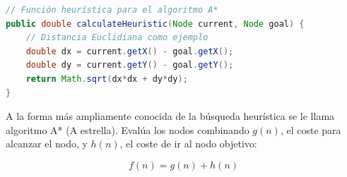 \begin{lstlisting}[language=Java, caption=Ejemplo de cálculo de heurística A*, label=lst:a-star-heuristic]
// Función heurística para el algoritmo A*
public double calculateHeuristic(Node current, Node goal) {
    // Distancia Euclidiana como ejemplo
    double dx = current.getX() - goal.getX();
    double dy = current.getY() - goal.getY();
    return Math.sqrt(dx*dx + dy*dy);
}
\end{lstlisting}
A la forma más ampliamente conocida de la búsqueda heurística se le llama algoritmo	A* (A estrella). Evalúa los nodos combinando $g(n)$, el coste para alcanzar el nodo, y $h(n)$, el coste de ir al nodo objetivo:

\begin{equation} \label{eq:heuristica}
	f(n)=g(n)+h(n)
\end{equation}